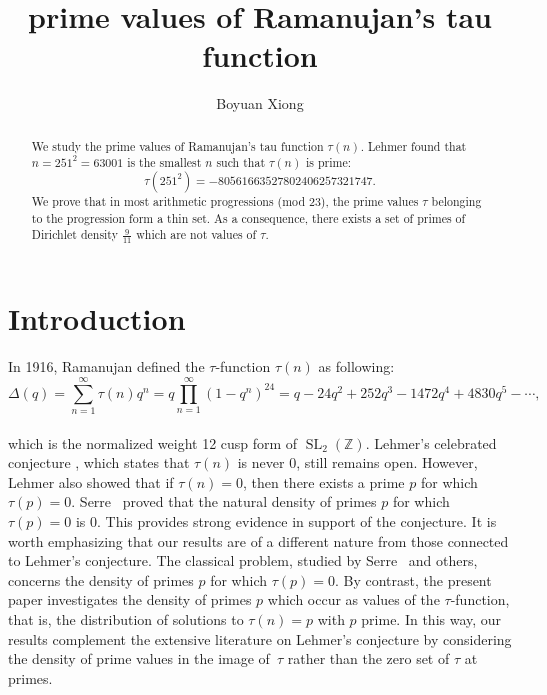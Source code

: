 \documentclass[12pt]{amsart}
\newcommand{\Z}{\mathbb{Z}}
\newcommand{\SL}{\operatorname{SL}}
\numberwithin{equation}{section}
\begin{document}
\title{prime values of Ramanujan's tau function}
\author{Boyuan Xiong}
\address{Department of Mathematics, Indiana University, Bloomington, IN 47405, USA}




\begin{abstract}
We study the prime values of Ramanujan's tau function $\tau(n)$. Lehmer \cite{Lehmer2} found that $n=251^2=63001$ is the smallest $n$ such that $\tau(n)$ is prime: $$\tau(251^2)=-80561663527802406257321747.$$ We prove that in most arithmetic progressions (mod 23), the prime values $\tau$ belonging to the progression form a thin set. As a consequence, there exists a set of primes of Dirichlet density $\frac{9}{11}$ which are not values of $\tau$.
\end{abstract}
\maketitle



\section{Introduction}
In 1916, Ramanujan \cite{Ramanujan1916} defined the $\tau$-function  $\tau(n)$ as following: $$\Delta(q)=\sum_{n=1}^\infty\tau(n)q^n=q\prod_{n=1}^\infty(1-q^n)^{24}=q-24q^2+252q^3-1472q^4+4830q^5-\cdots,$$\\which is the normalized weight 12 cusp form of $\SL_2(\Z)$. Lehmer's celebrated conjecture \cite{Lehmer}, which states that $\tau(n)$ is never 0, still remains open. However, Lehmer also showed that if $\tau(n)=0$, then there exists a prime $p$ for which $\tau(p)=0$. Serre~\cite{serre1981} proved that the natural density of primes $p$ for which $\tau(p)=0$ is $0$. This provides strong evidence in support of the conjecture. It is worth emphasizing that our results are of a different nature from those 
connected to Lehmer's conjecture.  The classical problem, studied by Serre~\cite{serre1981} 
and others, concerns the density of primes $p$ for which $\tau(p)=0$.  
By contrast, the present paper investigates the density of primes $p$ which 
occur as values of the $\tau$-function, that is, the distribution of 
solutions to $\tau(n)=p$ with $p$ prime.  In this way, our results complement 
the extensive literature on Lehmer’s conjecture by considering the density of 
prime values in the image of~$\tau$ rather than the zero set of $\tau$ at primes.\\
\end{document}
